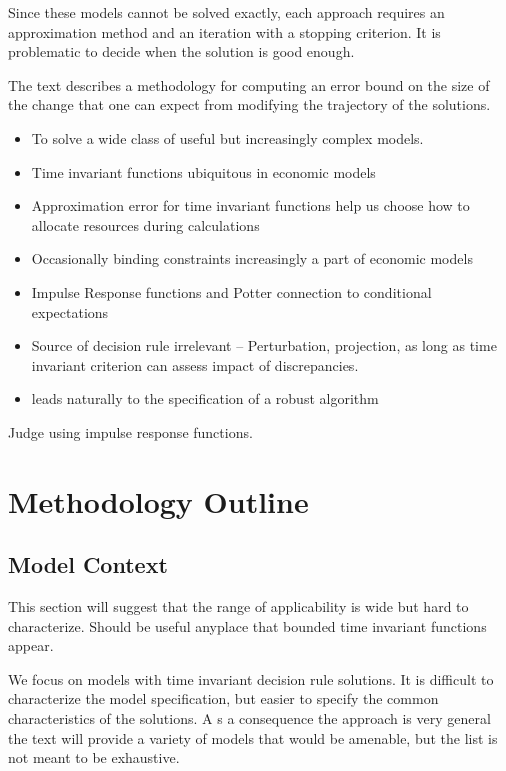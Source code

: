 \documentclass[12pt]{article}
\begin{document}
Since these models cannot be solved exactly, each approach requires an
approximation method and an iteration with a stopping criterion.
It is problematic to decide when the solution is good enough.

The text describes a methodology for computing an error bound on the 
size of the change that one can expect from modifying the trajectory of the 
solutions.

\begin{itemize}
\item To solve a wide class of useful but increasingly complex models. 
\item Time invariant functions ubiquitous in economic models
\item Approximation error for time invariant functions help us choose how to allocate resources during calculations
\item Occasionally binding constraints increasingly a part of economic models
\item Impulse Response functions and Potter connection to conditional expectations
\item Source of decision rule irrelevant --  Perturbation, projection, as long as time invariant criterion can assess impact of discrepancies.
\item leads naturally to the specification of a robust algorithm
\end{itemize}



Judge using impulse response functions.\cite{Potter2000}
\section{Methodology Outline}

\subsection{Model Context}
\label{sec:model-context}

This section will suggest that the range of applicability is wide but
hard to characterize.
Should be useful anyplace that bounded time invariant functions appear.

We focus on models with time invariant decision rule solutions. 
It is difficult to characterize the model specification, but easier to specify the common characteristics of the solutions.  A s a consequence the approach is very general the text will provide a variety of models that would be amenable, but the list is not meant to be exhaustive.
\end{document}
